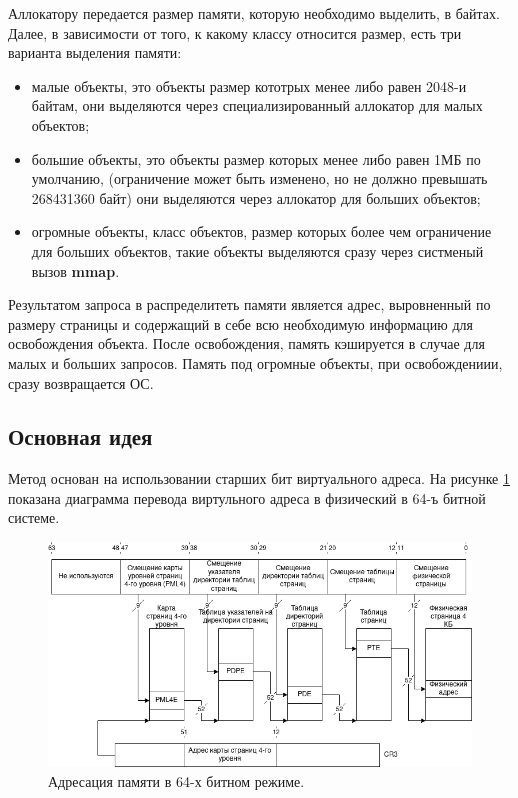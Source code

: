 Аллокатору передается размер памяти, которую необходимо выделить, в байтах. Далее, в зависимости от того, к какому классу относится размер, есть три варианта выделения памяти:
\begin{itemize}
	\item малые объекты, это объекты размер кототрых менее либо равен 2048-и байтам, они выделяются через специализированный аллокатор для малых объектов;
	\item большие объекты, это объекты размер которых менее либо равен 1МБ по умолчанию, (ограничение может быть изменено, но не должно превышать 268431360 байт) они выделяются через аллокатор для больших объектов;
	\item огромные объекты, класс объектов, размер которых более чем ограничение для больших объектов, такие объекты выделяются сразу через систменый вызов \textbf{mmap}.
\end{itemize}

Результатом запроса в распределитеть памяти является адрес, выровненный по размеру страницы и содержащий в себе всю необходимую информацию для освобождения объекта. После освобождения, память кэшируется в случае для малых и больших запросов. Память под огромные объекты, при освобождениии, сразу возвращается ОС.

\subsection{Основная идея}
Метод основан на использовании старших бит виртуального адреса. На рисунке \ref{64bit-memory-addressing} показана диаграмма перевода виртульного адреса в физический в 64-ъ битной системе.

\begin{figure}[!h]
	\begin{center}
		\includegraphics[scale=0.6]{images/64bit-memory-addressing.png}
		\caption{Адресация памяти в 64-х битном режиме.}
		\label{64bit-memory-addressing}
	\end{center}
\end{figure}


